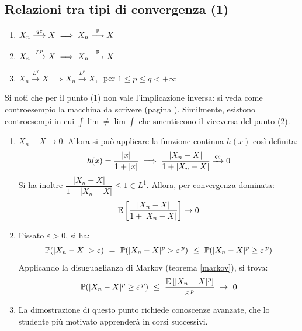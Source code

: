 \subsection{Relazioni tra tipi di convergenza (1)}
\begin{teob}[\JPTh{17.2}]\label{prop-rel-conv}
  \Fixvmode
  \begin{enumerate}
    \item $X_n \stackrel{qc}{\longrightarrow} X  \implies X_n \stackrel{\mathbb P}{\longrightarrow} X$
    \item $X_n \stackrel{L^p}{\longrightarrow} X \implies X_n \stackrel{\mathbb P}{\longrightarrow} X$
    \item $X_n \stackrel{L^q}{\longrightarrow} X \implies X_n \stackrel{L^p}{\longrightarrow} X, \ $ per $ 1 \le p \le q < +\infty$
  \end{enumerate}
\end{teob}
Si noti che per il punto (1) non vale l'implicazione inversa: si veda come controesempio la macchina da scrivere (pagina \pageref{ese-macchina-scrivere}).
Similmente, esistono controesempi in cui $ \int \lim \ne \lim \int$ che smentiscono il viceversa del punto (2).

\begin{dimo}
  \Fixvmode
  \begin{enumerate}
    \item $X_n - X \to 0$. Allora si può applicare la funzione continua $h(x)$ così definita:
      $$h(x) = \dfrac {\lvert x\rvert} {1 + \lvert x\rvert} \implies \dfrac {|X_n - X|} {1 + |X_n - X|} \xrightarrow{qc} 0 $$
      Si ha inoltre $\dfrac {|X_n - X|} {1 + |X_n - X|} \le 1 \in L^1$. Allora, per convergenza dominata:
      $$\mathbb E \left[ \dfrac {|X_n - X|} {1 + |X_n - X|} \right] \to 0$$

    \item Fissato $\varepsilon > 0$, si ha:
      $$\PP(|X_n - X| > \varepsilon) \ =\ \PP(|X_n - X|^p > \varepsilon\,^p) \ \le\ \PP(|X_n - X|^p \ge \varepsilon\,^p)$$
      Applicando la disuguaglianza di Markov (teorema \ref{markov}), si trova:
      $$\PP(|X_n - X|^p \ge \varepsilon\,^p) \ \le\ \dfrac {\Ex{|X_n - X|^p}} {\varepsilon\,^p}\ \to\ 0$$

    \item La dimostrazione di questo punto richiede conoscenze avanzate, che lo studente più motivato apprenderà in corsi successivi. \qedhere
  \end{enumerate}
\end{dimo}
\Fixvmode

